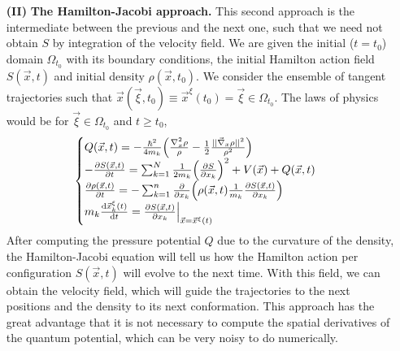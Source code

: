 \documentclass[11pt, a4paper]{article} %
\begin{document}
\begin{itemize}
\item[{\bf (II)}] {\bf The Hamilton-Jacobi approach.} This second approach is the intermediate between the previous and the next one, such that we need not obtain $S$ by integration of the velocity field. We are given the initial ($t=t_0$) domain $\Omega_{t_0}$ with its boundary conditions, the initial Hamilton action field $S(\vec{x},t)$ and initial density $\rho(\vec{x},t_0)$. We consider the ensemble of tangent trajectories such that $\vec{x}(\vec{\xi},t_0)\equiv\vec{x}^\xi(t_0)=\vec{\xi}\in\Omega_{t_0}$. The laws of physics would be for $\vec{\xi}\in\Omega_{t_0}$ and $t\geq t_0$,
\begin{equation}
\begin{cases}
Q(\vec{x},t) = -\frac{\hbar^2}{4m_k }\qty(\frac{\nabla_x^2\rho}{\rho} -\frac{1}{2}\frac{\qty||\vec{\nabla}_x \rho||^2}{\rho^2}) \\
-\pdv{S(\vec{x},t)}{t} = \sum_{k=1}^N\frac{1}{2m_k} \qty(\pdv{S}{x_k})^2+V(\vec{x})+Q(\vec{x},t)\\
\pdv{\rho(\vec{x},t)}{t}=-\sum_{k=1}^n\pdv{}{x_k} \qty(\rho(\vec{x},t)\frac{1}{m_k}\pdv{S(\vec{x},t)}{x_k})\\
m_k\dv{\vec{x}_k^\xi(t)}{t}=\pdv{S(\vec{x},t)}{x_k}\Big\rvert_{\vec{x}=\vec{x}^\xi(t)} \\
\end{cases}
\end{equation}
After computing the pressure potential $Q$ due to the curvature of the density, the Hamilton-Jacobi equation will tell us how the Hamilton action per configuration $S(\vec{x},t)$ will evolve to the next time. With this field, we can obtain the velocity field, which will guide the trajectories to the next positions and the density to its next conformation. This approach has the great advantage that it is not necessary to compute the spatial derivatives of the quantum potential, which can be very noisy to do numerically.


\end{itemize}
\end{document}
